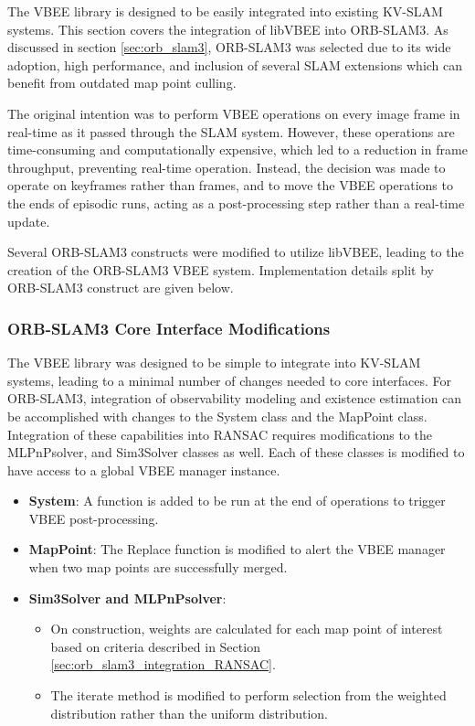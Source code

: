 The VBEE library is designed to be easily integrated into existing KV-SLAM systems. This section covers the integration of libVBEE into ORB-SLAM3. As discussed in section \ref{sec:orb_slam3}, ORB-SLAM3 was selected due to its wide adoption, high performance, and inclusion of several SLAM extensions which can benefit from outdated map point culling.

The original intention was to perform VBEE operations on every image frame in real-time as it passed through the SLAM system. However, these operations are time-consuming and computationally expensive, which led to a reduction in frame throughput, preventing real-time operation. Instead, the decision was made to operate on keyframes rather than frames, and to move the VBEE operations to the ends of episodic runs, acting as a post-processing step rather than a real-time update.

Several ORB-SLAM3 constructs were modified to utilize libVBEE, leading to the creation of the ORB-SLAM3 VBEE system. Implementation details split by ORB-SLAM3 construct are given below.

\subsubsection{ORB-SLAM3 Core Interface Modifications}

The VBEE library was designed to be simple to integrate into KV-SLAM systems, leading to a minimal number of changes needed to core interfaces. For ORB-SLAM3, integration of observability modeling and existence estimation can be accomplished with changes to the System class and the MapPoint class. Integration of these capabilities into RANSAC requires modifications to the MLPnPsolver, and Sim3Solver classes as well. Each of these classes is modified to have access to a global VBEE manager instance.

\begin{itemize}
    \item \textbf{System}: A function is added to be run at the end of operations to trigger VBEE post-processing.
    \item \textbf{MapPoint}: The Replace function is modified to alert the VBEE manager when two map points are successfully merged.
    \item \textbf{Sim3Solver and MLPnPsolver}:
    \begin{itemize}
        \item On construction, weights are calculated for each map point of interest based on criteria described in Section \ref{sec:orb_slam3_integration_RANSAC}.
        \item The iterate method is modified to perform selection from the weighted distribution rather than the uniform distribution.
    \end{itemize}
\end{itemize}

